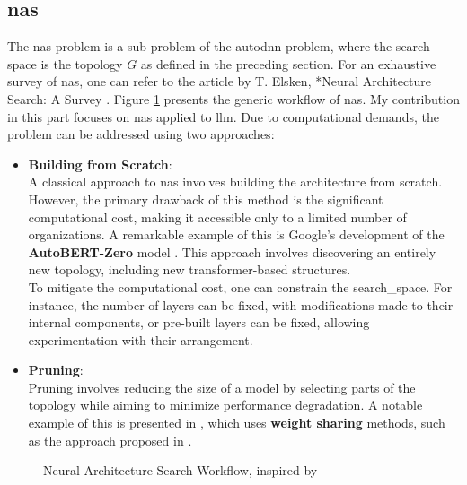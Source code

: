 \subsection{\acrfull{nas}}
\label{sec : nas}

The \acrshort{nas} problem is a sub-problem of the \acrshort{autodnn} problem, where the search space is the topology \( G \) as defined in the preceding section. For an exhaustive survey of \acrshort{nas}, one can refer to the article by T. Elsken, *Neural Architecture Search: A Survey \cite{elsken_neural_2019}. Figure \ref{fig:nas} presents the generic workflow of \acrshort{nas}. My contribution in this part focuses on \acrshort{nas} applied to \acrshort{llm}. Due to computational demands, the problem can be addressed using two approaches:

\begin{itemize}
    

    \item \textbf{Building from Scratch}:\\
    A classical approach to \acrshort{nas} involves building the architecture from scratch. However, the primary drawback of this method is the significant computational cost, making it accessible only to a limited number of organizations. A remarkable example of this is Google's development of the \textbf{AutoBERT-Zero} model \cite{gao_autobert-zero_2022}. This approach involves discovering an entirely new topology, including new transformer-based structures.\\
    To mitigate the computational cost, one can constrain the \gls{search_space}. For instance, the number of layers can be fixed, with modifications made to their internal components, or pre-built layers can be fixed, allowing experimentation with their arrangement.

    \item \textbf{Pruning}:\\
    Pruning involves reducing the size of a model by selecting parts of the topology while aiming to minimize performance degradation. A notable example of this is presented in \cite{klein_structural_2023}, which uses \textbf{weight sharing} methods, such as the approach proposed in \cite{pham_efficient_2018}.
\end{itemize}

\begin{figure}
    \centering
    
    \caption{Neural Architecture Search Workflow, inspired by \cite{elsken_neural_2019}}
    \label{fig:nas}
\end{figure}

